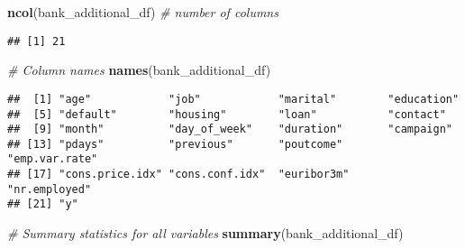 \documentclass[
]{article}
\newenvironment{Shaded}{\begin{snugshade}}{\end{snugshade}}
\newcommand{\CommentTok}[1]{\textcolor[rgb]{0.56,0.35,0.01}{\textit{#1}}}
\newcommand{\FunctionTok}[1]{\textcolor[rgb]{0.13,0.29,0.53}{\textbf{#1}}}
\newcommand{\NormalTok}[1]{#1}
\begin{document}
\begin{Shaded}
\begin{Highlighting}[]
\FunctionTok{ncol}\NormalTok{(bank\_additional\_df)  }\CommentTok{\# number of columns}
\end{Highlighting}
\end{Shaded}

\begin{verbatim}
## [1] 21
\end{verbatim}

\begin{Shaded}
\begin{Highlighting}[]
\CommentTok{\# Column names}
\FunctionTok{names}\NormalTok{(bank\_additional\_df)}
\end{Highlighting}
\end{Shaded}

\begin{verbatim}
##  [1] "age"            "job"            "marital"        "education"     
##  [5] "default"        "housing"        "loan"           "contact"       
##  [9] "month"          "day_of_week"    "duration"       "campaign"      
## [13] "pdays"          "previous"       "poutcome"       "emp.var.rate"  
## [17] "cons.price.idx" "cons.conf.idx"  "euribor3m"      "nr.employed"   
## [21] "y"
\end{verbatim}

\begin{Shaded}
\begin{Highlighting}[]
\CommentTok{\# Summary statistics for all variables}
\FunctionTok{summary}\NormalTok{(bank\_additional\_df)}
\end{Highlighting}
\end{Shaded}
\end{document}
